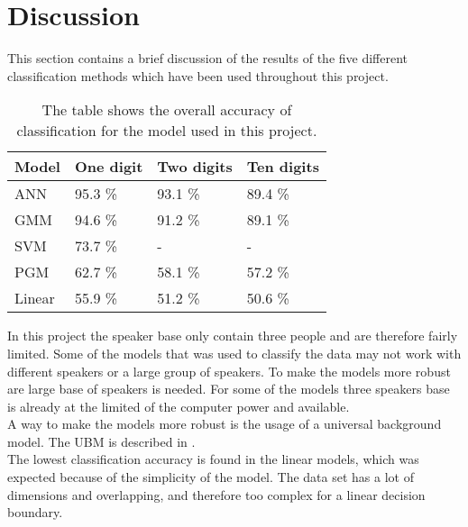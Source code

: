 \section*{Discussion}
This section contains a brief discussion of the results of the five different classification methods which have been used throughout this project. 

\begin{table}[h]
\begin{tabular}{@{}l|lll@{}}
\toprule
Model 		   		   & One digit            & Two digits  & Ten digits   \\ \midrule
ANN                    & 95.3 \%                & 93.1 \%   & 89.4 \% \\
GMM                    & 94.6 \%                & 91.2 \%   & 89.1 \% \\
SVM                    & 73.7 \%                & - 	    & -       \\ 
PGM                    & 62.7 \% 				& 58.1 \%   & 57.2 \% \\
Linear                 & 55.9 \% 				& 51.2 \%   & 50.6 \%

\end{tabular}
\caption{The table shows the overall accuracy of classification for the model used in this project. }
\label{table:result}
\end{table}

In this project the speaker base only contain three people and are therefore fairly limited. 
Some of the models that was used to classify the data may not work with different speakers or a large group of speakers.
To make the models more robust are large base of speakers is needed.
For some of the models three speakers base is already at the limited of the computer power and  available.\\

A way to make the models more robust is the usage of a universal background model.
The UBM is described in \cite{Springer:36}.\\

The lowest classification accuracy is found in the linear models, which was expected because of the simplicity of the model.
The data set has a lot of dimensions and overlapping, and therefore too complex for a linear decision boundary.
  

